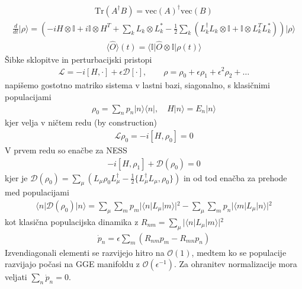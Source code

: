 \documentclass[a4paper,10pt]{article}
\begin{document}
\begin{align}
  \text{Tr}(A^{\dagger} B) = \text{vec}(A)^{\dagger} \text{vec}(B)
\end{align}
\begin{align}
  \frac{d}{dt}\vert{}\rho\rangle = \left( -i H \otimes \mathbb{I} + i \mathbb{I} \otimes H^T + \sum_{k} L_{k} \otimes L_{k}^* - \frac{1}{2} \sum_{k} (L_{k}^{\dagger} L_{k} \otimes \mathbb{I} + \mathbb{I} \otimes L_{k}^T L_{k}^*) \right) \vert{}\rho\rangle
\end{align}
\begin{align}
  \langle \hat{O} \rangle(t) = \langle \mathbb{I} \vert{} \hat{O} \otimes \mathbb{I} \vert{} \rho(t) \rangle
\end{align}
Šibke sklopitve in perturbacijski pristopi
\begin{align}
  \mathcal{L} = -i [H, \cdot] + \epsilon \mathcal{D}[\cdot], \quad  \quad \rho = \rho_{0} + \epsilon \rho_{1} + \epsilon^2 \rho_{2} + \dots
\end{align}
napišemo gostotno matriko sistema v lastni bazi, siagonalno, s klasičnimi populacijami
\begin{align}
  \rho_{0} = \sum_{n} p_{n} \vert{}n\rangle \langle n\vert{}, \quad H\vert{}n\rangle = E_{n} \vert{}n\rangle
\end{align}
kjer velja v ničtem redu (by construction)
\begin{align}
  \mathcal{L}\rho_0 = -i [H, \rho_0] = 0
\end{align}
V prvem redu so enačbe za NESS
\begin{align}
  -i [H, \rho_1] + \mathcal{D}(\rho_0) = 0
\end{align}
kjer je $\mathcal{D}(\rho_0) = \sum_\mu \left( L_\mu \rho_0 L_\mu^\dagger - \frac{1}{2} \{L_\mu^\dagger L_\mu, \rho_0\} \right)$ in od tod enačba za prehode med populacijami
\begin{align}
  \langle n \vert{} \mathcal{D}(\rho_0) \vert{} n \rangle = \sum_\mu \sum_m p_m \vert{}\langle n \vert{} L_\mu \vert{} m \rangle\vert{}^2 - \sum_\mu \sum_m p_n \vert{}\langle m \vert{} L_\mu \vert{} n \rangle\vert{}^2 
\end{align}
kot klasična populacijska dinamika z $R_{nm} = \sum_\mu \vert{}\langle n \vert{} L_\mu \vert{} m \rangle\vert{}^2$
\begin{align}
  \dot{p}_n = \epsilon \sum_m \left( R_{nm} p_m - R_{mn} p_n \right)
\end{align}
Izvendiagonali elementi se razvijejo hitro na $\mathcal{O}(1)$, medtem ko se populacije razvijajo počasi na GGE manifoldu z $\mathcal{O}(\epsilon^{-1})$. Za ohranitev normalizacije mora veljati $\sum_n \dot{p}_n = 0$.
\end{document}
